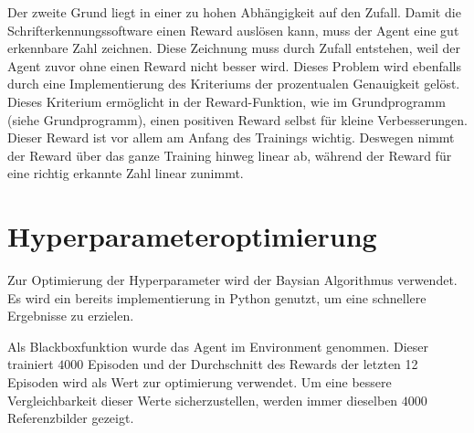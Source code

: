 Der zweite Grund liegt in einer zu hohen Abhängigkeit auf den Zufall. Damit die
Schrifterkennungssoftware einen Reward auslösen kann, muss der Agent eine gut
erkennbare Zahl zeichnen. Diese Zeichnung muss durch Zufall entstehen, weil der
Agent zuvor ohne einen Reward nicht besser wird. Dieses Problem wird ebenfalls
durch eine Implementierung des Kriteriums der prozentualen Genauigkeit gelöst.
Dieses Kriterium ermöglicht in der Reward-Funktion, wie im Grundprogramm (siehe
Grundprogramm), einen positiven Reward selbst für kleine Verbesserungen. Dieser
Reward ist vor allem am Anfang des Trainings wichtig. Deswegen nimmt der Reward
über das ganze Training hinweg linear ab, während der Reward für eine richtig
erkannte Zahl linear zunimmt.


\section{Hyperparameteroptimierung}
\label{chap:Hyperparameter Optimierung}
Zur Optimierung der Hyperparameter wird der Baysian Algorithmus verwendet. Es
wird ein bereits implementierung in Python genutzt, um eine schnellere
Ergebnisse zu erzielen. \cite{fernando_bayesian_2022}

Als Blackboxfunktion wurde das Agent im Environment genommen. Dieser trainiert
$4000$ Episoden und der Durchschnitt des Rewards der letzten 12 Episoden wird
als Wert zur optimierung verwendet. Um eine bessere Vergleichbarkeit dieser
Werte sicherzustellen, werden immer dieselben $4000$ Referenzbilder gezeigt.

